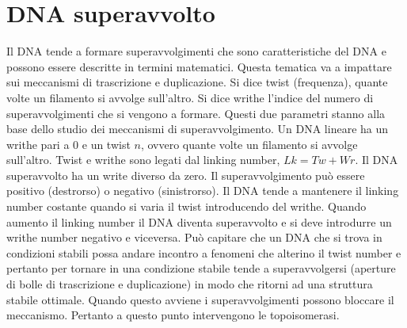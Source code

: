 \section{DNA superavvolto}
Il DNA tende a formare superavvolgimenti che sono caratteristiche del DNA e possono essere descritte in termini matematici. Questa tematica va a impattare sui meccanismi di trascrizione
e duplicazione. Si dice twist (frequenza), quante volte un filamento si avvolge sull'altro. Si dice writhe l'indice del numero di superavvolgimenti che si vengono a formare. Questi due 
parametri stanno alla base dello studio dei meccanismi di superavvolgimento. Un DNA lineare ha un writhe pari a $0$ e un twist $n$, ovvero quante volte un filamento si avvolge sull'altro.
Twist e writhe sono legati dal linking number, $Lk = Tw + Wr$. Il DNA superavvolto ha un write diverso da zero. Il superavvolgimento pu\`o essere positivo (destrorso) o negativo 
(sinistrorso). Il DNA tende a mantenere il linking number costante quando si varia il twist introducendo del writhe. Quando aumento il linking number il DNA diventa superavvolto e si 
deve introdurre un writhe number negativo e viceversa. Pu\`o capitare che un DNA che si trova in condizioni stabili possa andare incontro a fenomeni che alterino il twist number e 
pertanto per tornare in una condizione stabile tende a superavvolgersi (aperture di bolle di trascrizione e duplicazione) in modo che ritorni ad una struttura stabile ottimale. Quando
questo avviene i superavvolgimenti possono bloccare il meccanismo. Pertanto a questo punto intervengono le topoisomerasi.
